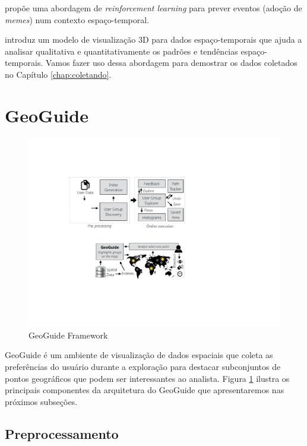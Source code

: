  propõe uma abordagem de {\em reinforcement learning} para prever eventos (adoção de {\em memes}) num contexto espaço-temporal.

 introduz um modelo de visualização 3D para dados espaço-temporais que ajuda a analisar qualitativa e quantitativamente os padrões e tendências espaço-temporais. Vamos fazer uso dessa abordagem para demostrar os dados coletados no Capítulo \ref{chap:coletando}.

\section{GeoGuide}

\begin{figure}[t]
	\centering
	\includegraphics[width=\columnwidth]{imagens/framework}
	\caption{GeoGuide Framework}
	\label{fig:framework}
	\vspace{-10pt}
\end{figure}

GeoGuide  \cite{omidvarTehrani2017} é um ambiente de visualização de dados espaciais que coleta as preferências do usuário durante a exploração para destacar subconjuntos de pontos geográficos que podem ser interessantes ao analista. Figura \ref{fig:framework} ilustra os principais componentes da arquitetura do GeoGuide que apresentaremos nas próximos subseções.

\subsection{Preprocessamento}

